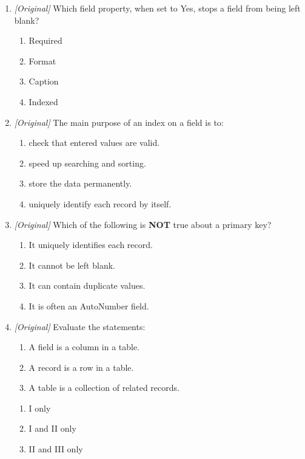 \begin{enumerate}[label=\textbf{Q\arabic*.}, leftmargin=*]
\begin{enumerate}[label=\Alph*.]
    \item Validation Text
    \item Field Size
  \end{enumerate}
\item \textit{[Original]} Which field property, when set to Yes, stops a field
  from being left blank?
  \begin{enumerate}[label=\Alph*.]
    \item Required
    \item Format
    \item Caption
    \item Indexed
  \end{enumerate}
\item \textit{[Original]} The main purpose of an index on a field is to:
  \begin{enumerate}[label=\Alph*.]
    \item check that entered values are valid.
    \item speed up searching and sorting.
    \item store the data permanently.
    \item uniquely identify each record by itself.
  \end{enumerate}
\item \textit{[Original]} Which of the following is \textbf{NOT} true about a
  primary key?
  \begin{enumerate}[label=\Alph*.]
    \item It uniquely identifies each record.
    \item It cannot be left blank.
    \item It can contain duplicate values.
    \item It is often an AutoNumber field.
  \end{enumerate}
\item \textit{[Original]} Evaluate the statements:
  \begin{enumerate}[label=\Roman*.]
    \item A field is a column in a table.
    \item A record is a row in a table.
    \item A table is a collection of related records.
  \end{enumerate}
  \begin{enumerate}[label=\Alph*.]
    \item I only
    \item I and II only
    \item II and III only

\end{enumerate}
\end{enumerate}
